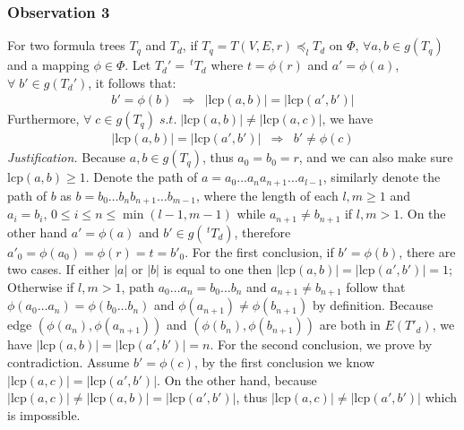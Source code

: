 \documentclass{acm_proc_article-sp}
\begin{document}
\subsubsection{Observation 3} 
\label{observation3}
For two formula trees $T_q$ and $T_d$, if $T_q = T(V,E,r) \preceq_l T_d$ on $\Phi$,  
$\forall a,b \in g(T_q)$ and a mapping $\phi \in \Phi$. 
Let $T_d' = \, ^{t}T_d$ where $t = \phi(r)$ and $a' = \phi(a)$, $\forall\; b' \in g(T_d')$, it follows that:
$$
\begin{array}{lcr}
b' = \phi(b)  & \Rightarrow & 
\left| \mathrm{lcp}(a,b) \right| = \left| \mathrm{lcp}(a',b') \right|
\end{array}
$$
Furthermore, $\forall\; c \in g(T_q)\; s.t.\; \left| \mathrm{lcp}(a,b) \right| \neq \left| \mathrm{lcp}(a,c) \right| $, we have
$$
\begin{array}{lcr}
\left| \mathrm{lcp}(a,b) \right| = \left| \mathrm{lcp}(a',b') \right|
& \Rightarrow &
b' \neq \phi(c)
\end{array} 
$$
\textit{Justification.} 
Because $a,b \in g(T_q)$, thus $a_0 = b_0 = r$, and we can also make sure $\mathrm{lcp}(a,b) \ge 1$. 
Denote the path of $a = a_0 \ldots a_n a_{n+1} \ldots a_{l-1}$, similarly denote the path of $b$ as $b=b_0 \ldots b_n b_{n+1} \ldots b_{m-1}$,
where the length of each $l,m \ge 1$ and $a_i = b_i,\, 0 \le i \le n \le \min(l-1, m-1)$ while $a_{n+1} \neq b_{n+1}$ if $l,m > 1$.
On the other hand $a' = \phi(a)$ and $b' \in g(\,^{t}T_d)$, therefore $a'_0 = \phi(a_0) = \phi(r) = t = b'_0$.
For the first conclusion, if $b' = \phi(b)$, there are two cases. If either $|a|$ or $|b|$ is equal to one then $\left| \mathrm{lcp}(a,b) \right| = \left| \mathrm{lcp}(a',b') \right| = 1$;
Otherwise if $l,m > 1$, path $a_0 \ldots a_n = b_0 \ldots b_n$ and $a_{n+1} \neq b_{n+1}$ follow that $\phi(a_0 \ldots a_n) = \phi(b_0 \ldots b_n)$ and $\phi(a_{n+1}) \neq \phi(b_{n+1})$ by definition.
Because edge $(\phi(a_n), \phi(a_{n+1}))$ and $(\phi(b_n), \phi(b_{n+1}))$ are both in $E(T'_d)$, 
we have $\left| \mathrm{lcp}(a,b) \right| = \left| \mathrm{lcp}(a',b') \right| = n$.
For the second conclusion, we prove by contradiction. 
Assume $b' = \phi(c)$, by the first conclusion we know $\left| \mathrm{lcp}(a,c) \right| = \left| \mathrm{lcp}(a',b') \right|$.
On the other hand, because $\left| \mathrm{lcp}(a,c) \right| \neq \left| \mathrm{lcp}(a,b) \right| =  \left| \mathrm{lcp}(a',b') \right|$, 
thus $\left| \mathrm{lcp}(a,c) \right| \neq \left| \mathrm{lcp}(a',b') \right|$ which is impossible. 
\end{document}
